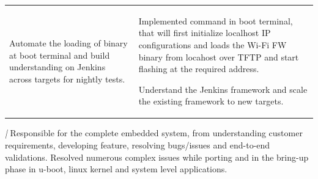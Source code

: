 \begingroup
\setlength{\tabcolsep}{5pt} %
\indent\begin{tabularx}{\textwidth}{p{} p{\RIGHTCOLUMNWIDTH}} %
   Automate the loading of binary at boot terminal and build understanding on Jenkins across targets for nightly tests.
         &
        \vspace{-\topsep}\vspace{2pt} \begin{myitemize}
    \footnotesize {
      \item \noindent Implemented command in boot terminal, that will first initialize localhost IP configurations and loads the Wi-Fi FW binary from locahost over TFTP and start flashing at the required address.
      \item \noindent Understand the Jenkins framework and scale the existing framework to new targets.
    }
   \end{myitemize}\vspace{-\topsep}%
\end{tabularx}
\endgroup
\sectionsep
%
%
\vspace{-5pt}%
%
%
%
%
{\noindent \color{ltgrey}\small{\textit{\CompanyIExp{} | \CompanyILoc{}}}}\newline%
 Responsible for the complete embedded system, from understanding customer requirements, developing feature, resolving bugs/issues and end-to-end validations.
 Resolved numerous complex issues while porting and in the bring-up phase in u-boot, linux kernel and system level applications.
\newline %
